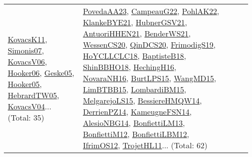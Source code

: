{\begin{longtable}{lp{3cm}>{\raggedright}p{6cm}>{\raggedright}p{6cm}p{8cm}}
\href{articles/KovacsK11.pdf}{KovacsK11}\cite{KovacsK11}, \href{articles/Simonis07.pdf}{Simonis07}\cite{Simonis07}, \href{papers/KovacsV06.pdf}{KovacsV06}\cite{KovacsV06}, \href{articles/Hooker06.pdf}{Hooker06}\cite{Hooker06}, \href{papers/Geske05.pdf}{Geske05}\cite{Geske05}, \href{articles/Hooker05.pdf}{Hooker05}\cite{Hooker05}, \href{papers/HebrardTW05.pdf}{HebrardTW05}\cite{HebrardTW05}, \href{papers/KovacsV04.pdf}{KovacsV04}\cite{KovacsV04}... (Total: 35) & \href{papers/PovedaAA23.pdf}{PovedaAA23}\cite{PovedaAA23}, \href{articles/CampeauG22.pdf}{CampeauG22}\cite{CampeauG22}, \href{articles/PohlAK22.pdf}{PohlAK22}\cite{PohlAK22}, \href{papers/KlankeBYE21.pdf}{KlankeBYE21}\cite{KlankeBYE21}, \href{articles/HubnerGSV21.pdf}{HubnerGSV21}\cite{HubnerGSV21}, \href{papers/AntuoriHHEN21.pdf}{AntuoriHHEN21}\cite{AntuoriHHEN21}, \href{papers/BenderWS21.pdf}{BenderWS21}\cite{BenderWS21}, \href{papers/WessenCS20.pdf}{WessenCS20}\cite{WessenCS20}, \href{articles/QinDCS20.pdf}{QinDCS20}\cite{QinDCS20}, \href{papers/FrimodigS19.pdf}{FrimodigS19}\cite{FrimodigS19}, \href{papers/HoYCLLCLC18.pdf}{HoYCLLCLC18}\cite{HoYCLLCLC18}, \href{articles/BaptisteB18.pdf}{BaptisteB18}\cite{BaptisteB18}, \href{articles/ShinBBHO18.pdf}{ShinBBHO18}\cite{ShinBBHO18}, \href{papers/HechingH16.pdf}{HechingH16}\cite{HechingH16}, \href{articles/NovaraNH16.pdf}{NovaraNH16}\cite{NovaraNH16}, \href{papers/BurtLPS15.pdf}{BurtLPS15}\cite{BurtLPS15}, \href{articles/WangMD15.pdf}{WangMD15}\cite{WangMD15}, \href{papers/LimBTBB15.pdf}{LimBTBB15}\cite{LimBTBB15}, \href{papers/LombardiBM15.pdf}{LombardiBM15}\cite{LombardiBM15}, \href{papers/MelgarejoLS15.pdf}{MelgarejoLS15}\cite{MelgarejoLS15}, \href{papers/BessiereHMQW14.pdf}{BessiereHMQW14}\cite{BessiereHMQW14}, \href{papers/DerrienPZ14.pdf}{DerrienPZ14}\cite{DerrienPZ14}, \href{articles/KameugneFSN14.pdf}{KameugneFSN14}\cite{KameugneFSN14}, \href{papers/AlesioNBG14.pdf}{AlesioNBG14}\cite{AlesioNBG14}, \href{papers/BonfiettiLM13.pdf}{BonfiettiLM13}\cite{BonfiettiLM13}, \href{papers/BonfiettiM12.pdf}{BonfiettiM12}\cite{BonfiettiM12}, \href{papers/BonfiettiLBM12.pdf}{BonfiettiLBM12}\cite{BonfiettiLBM12}, \href{papers/IfrimOS12.pdf}{IfrimOS12}\cite{IfrimOS12}, \href{articles/TrojetHL11.pdf}{TrojetHL11}\cite{TrojetHL11}... (Total: 62)\\

\end{longtable}}
